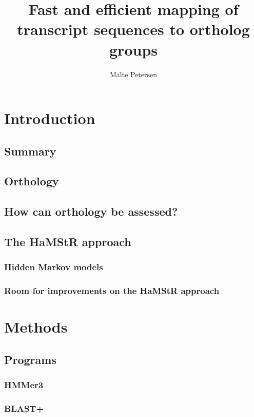 \documentclass[a4paper]{scrreprt}
\title{Fast and efficient mapping of transcript sequences to ortholog groups}
\author{Malte Petersen}
\newcommand{\hamstr}{HaMStR\xspace}
\begin{document}
\maketitle
\tableofcontents

% 
% 
% 

\chapter{Introduction}
	\section{Summary}
	\section{Orthology}
		
	\section{How can orthology be assessed?}
	\section{The \hamstr approach}
		\subsection{Hidden Markov models}
			
		\subsection{Room for improvements on the \hamstr approach}
\chapter{Methods}
	\section{Programs}
		\subsection{HMMer3}
		\subsection{BLAST+}
\end{document}
